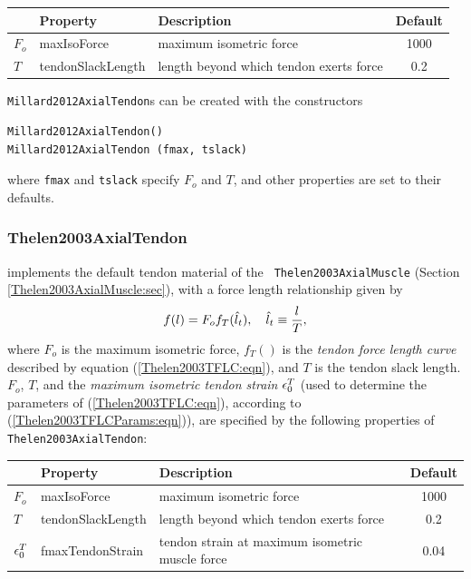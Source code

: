 \begin{center}
\begin{tabular}{|l|l|l|c|} 
\hline
& Property & Description & Default\\
\hline
$F_{o}$ & {\sf maxIsoForce} & 
maximum isometric force & 1000 \\
$T$ & {\sf tendonSlackLength} & 
length beyond which tendon exerts force & 0.2 \\
\hline
\end{tabular}
\end{center}

{\tt Millard2012AxialTendon}s can be created with the constructors
\begin{lstlisting}[]
Millard2012AxialTendon()
Millard2012AxialTendon (fmax, tslack)
\end{lstlisting}
%
where {\tt fmax} and {\tt tslack} specify $F_{o}$ and $T$, and
other properties are set to their defaults.

\subsubsection{Thelen2003AxialTendon}

implements the default tendon material of the {\tt
Thelen2003AxialMuscle} (Section \ref{Thelen2003AxialMuscle:sec}),
with a force length relationship given by
%
\begin{equation}
f(l) = F_o f_T (\hat{l}_t), \quad \hat{l}_t \equiv \frac{l}{T},
\end{equation}
%
where $F_o$ is the maximum isometric force, $f_T()$ is the {\it tendon
force length curve} described by equation (\ref{Thelen2003TFLC:eqn}),
and $T$ is the tendon slack length. $F_o$, $T$, and the {\it maximum
isometric tendon strain} $\epsilon_0^T$ (used to determine the parameters
of (\ref{Thelen2003TFLC:eqn}), according to (\ref{Thelen2003TFLCParams:eqn})),
are specified by the following properties of {\tt
Thelen2003AxialTendon}:

\begin{center}
\begin{tabular}{|l|l|l|c|} 
\hline
& Property & Description & Default\\
\hline
$F_{o}$ & {\sf maxIsoForce} & 
maximum isometric force & 1000 \\
$T$ & {\sf tendonSlackLength} & 
length beyond which tendon exerts force & 0.2 \\
$\epsilon_0^T$ & {\sf fmaxTendonStrain} & 
tendon strain at maximum isometric muscle force & 0.04 \\
\hline
\end{tabular}
\end{center}

